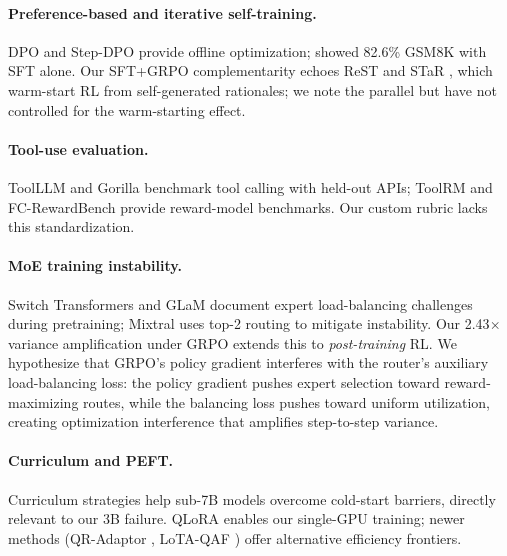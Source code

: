 \documentclass{article}
\begin{document}
\paragraph{Preference-based and iterative self-training.}
DPO \citep{rafailov2024dpo} and Step-DPO \citep{lai2024stepdpo} provide offline optimization; \citet{li2024common7b} showed 82.6\% GSM8K with SFT alone. Our SFT+GRPO complementarity echoes ReST \citep{gulcehre2023rest} and STaR \citep{zelikman2022star}, which warm-start RL from self-generated rationales; we note the parallel but have not controlled for the warm-starting effect.

\paragraph{Tool-use evaluation.}
ToolLLM \citep{qin2024toolllm} and Gorilla \citep{patil2023gorilla} benchmark tool calling with held-out APIs; ToolRM \citep{wang2025toolrm} and FC-RewardBench \citep{chen2025fcrewardbench} provide reward-model benchmarks. Our custom rubric lacks this standardization.

\paragraph{MoE training instability.}
Switch Transformers \citep{fedus2022switch} and GLaM \citep{du2022glam} document expert load-balancing challenges during pretraining; Mixtral \citep{jiang2024mixtral} uses top-2 routing to mitigate instability. Our 2.43$\times$ variance amplification under GRPO extends this to \emph{post-training} RL. We hypothesize that GRPO's policy gradient interferes with the router's auxiliary load-balancing loss: the policy gradient pushes expert selection toward reward-maximizing routes, while the balancing loss pushes toward uniform utilization, creating optimization interference that amplifies step-to-step variance.

\paragraph{Curriculum and PEFT.}
Curriculum strategies \citep{parashar2025curriculum, chen2025selfevolving} help sub-7B models overcome cold-start barriers, directly relevant to our 3B failure. QLoRA \citep{dettmers2023qlora} enables our single-GPU training; newer methods (QR-Adaptor \citep{zhou2025qradaptor}, LoTA-QAF \citep{chen2025lotaqaf}) offer alternative efficiency frontiers.

\end{document}
